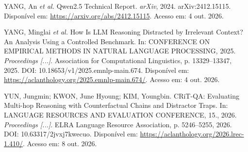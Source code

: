 \documentclass[12pt,a4paper]{article}
\begin{document}
\begin{singlespace}
\noindent YANG, An \textit{et al.} Qwen2.5 Technical Report. \textit{arXiv}, 2024. arXiv:2412.15115. Disponível em: \url{https://arxiv.org/abs/2412.15115}. Acesso em: 4 out. 2026.\par\medskip
\noindent YANG, Minglai \textit{et al.} How Is LLM Reasoning Distracted by Irrelevant Context? An Analysis Using a Controlled Benchmark. In: CONFERENCE ON EMPIRICAL METHODS IN NATURAL LANGUAGE PROCESSING, 2025. \textit{Proceedings [...]}. Association for Computational Linguistics, p. 13329--13347, 2025. DOI: 10.18653/v1/2025.emnlp-main.674. Disponível em: \url{https://aclanthology.org/2025.emnlp-main.674/}. Acesso em: 4 out. 2026.\par\medskip
\noindent YUN, Jungmin; KWON, June Hyoung; KIM, Youngbin. CRiT-QA: Evaluating Multi-hop Reasoning with Counterfactual Chains and Distractor Traps. In: LANGUAGE RESOURCES AND EVALUATION CONFERENCE, 15., 2026. \textit{Proceedings [...]}. ELRA Language Resource Association, p. 5246--5255, 2026. DOI: 10.63317/2jvxj7kwecuo. Disponível em: \url{https://aclanthology.org/2026.lrec-1.410/}. Acesso em: 8 out. 2026.\par\medskip
\end{singlespace}
\end{document}

